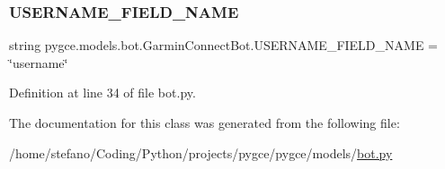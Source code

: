 \subsubsection{\texorpdfstring{U\+S\+E\+R\+N\+A\+M\+E\+\_\+\+F\+I\+E\+L\+D\+\_\+\+N\+A\+ME}{USERNAME\_FIELD\_NAME}}
{\footnotesize\ttfamily string pygce.\+models.\+bot.\+Garmin\+Connect\+Bot.\+U\+S\+E\+R\+N\+A\+M\+E\+\_\+\+F\+I\+E\+L\+D\+\_\+\+N\+A\+ME = \char`\"{}username\char`\"{}\hspace{0.3cm}{\ttfamily [static]}}



Definition at line 34 of file bot.\+py.



The documentation for this class was generated from the following file\+:\begin{DoxyCompactItemize}
\item 
/home/stefano/\+Coding/\+Python/projects/pygce/pygce/models/\hyperlink{bot_8py}{bot.\+py}\end{DoxyCompactItemize}
